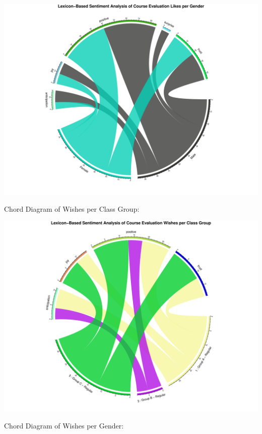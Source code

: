 \documentclass[
]{article}
\begin{document}
\includegraphics{AnalysisOfCourseEvaluation-Notebook_files/figure-latex/ChordDiagramLikesPerGender-1.pdf}

\newpage

Chord Diagram of Wishes per Class Group:

\includegraphics{AnalysisOfCourseEvaluation-Notebook_files/figure-latex/ChordDiagramPerGroup_Wishes-1.pdf}

\newpage

Chord Diagram of Wishes per Gender:
\end{document}
